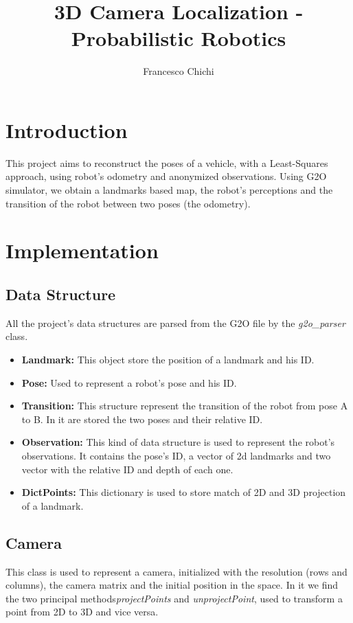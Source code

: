 \documentclass[10pt]{article}
\title{3D Camera Localization - Probabilistic Robotics}
\author{ Francesco Chichi}
\begin{document}
	\maketitle
	\section{Introduction}
		This project aims to reconstruct the poses of a vehicle, with a Least-Squares approach, using robot's odometry and anonymized observations. 
		Using G2O simulator, we obtain a landmarks based map, the robot's perceptions and the transition of the robot between two poses (the odometry).

	\section{Implementation}
		\subsection{Data Structure}
		All the project's data structures are parsed from the G2O file by the \textit{g2o\_parser} class.
		\begin{itemize}
			\item \textbf{Landmark:} This object store the position of a landmark and his ID.
			\item \textbf{Pose:} Used to represent a robot's pose and his ID.
			\item \textbf{Transition:} This structure represent the transition of the robot from pose A to B. In it are stored the two poses and their relative ID.
			\item \textbf{Observation:} This kind of data structure is used to represent the robot's observations. 
			It contains the pose's ID, a vector of 2d landmarks and two vector with the relative ID and depth of each one.
			\item \textbf{DictPoints:} This dictionary is used to store match of 2D and 3D projection of a landmark.
		\end{itemize}
	
		\subsection{Camera}
		This class is used to represent a camera, initialized with the resolution (rows and columns), the camera matrix and the initial position in the space.
		In it we find the two principal methods\textit{projectPoints} and \textit{unprojectPoint}, used to transform a point from 2D to 3D and vice versa.
		
\end{document}
